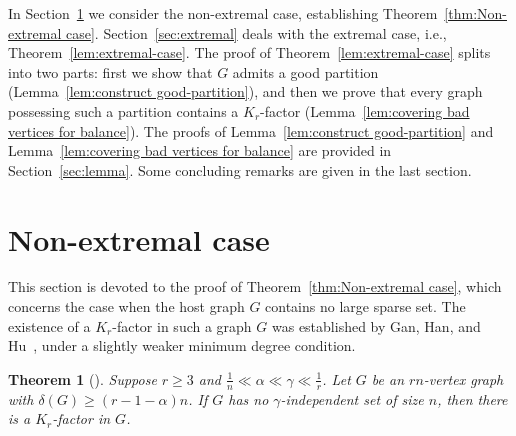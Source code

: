\documentclass[11pt, a4paper]{article}
\newtheorem{theorem}{Theorem}[section]
\newtheorem{definition}[theorem]{Definition}
\theoremstyle{definition}
\newcommand{\<}{\subseteq}
\newcommand{\de}{\delta}
\begin{document}
\medskip

 {In Section~\ref{sec:non-extremal} we consider the non-extremal case, establishing Theorem~\ref{thm:Non-extremal case}.
Section~\ref{sec:extremal} deals with the extremal case, i.e., Theorem~\ref{lem:extremal-case}.
The proof of Theorem~\ref{lem:extremal-case} splits into two parts: first we show that \(G\) admits a good partition (Lemma~\ref{lem:construct good-partition}), and then we prove that every graph possessing such a partition contains a \(K_r\)-factor (Lemma~\ref{lem:covering bad vertices for balance}).
The proofs of Lemma~\ref{lem:construct good-partition} and Lemma~\ref{lem:covering bad vertices for balance} are provided in Section~\ref{sec:lemma}. Some concluding remarks are given in the last section.}


\section{Non-extremal case}\label{sec:non-extremal}

This section is devoted to the proof of Theorem~\ref{thm:Non-extremal case}, which concerns the case when the host graph $G$ contains no large sparse set. The existence of a $K_r$-factor in such a graph $G$ was established by Gan, Han, and Hu~\cite{gan2024}, under a slightly weaker minimum degree condition.

\begin{theorem}[\cite{gan2024}]\label{thm:Non-extremal case r>3}
Suppose $r\ge 3$ and $\frac{1}{n}\ll\alpha\ll\gamma\ll\frac{1}{r}$. Let $G$ be an $rn$-vertex graph with $\de(G)\ge (r-1-\alpha)n$. If $G$ has no $\gamma$-independent set of size $n$, then there is a $K_r$-factor in $G$.
\end{theorem}
\end{document}
